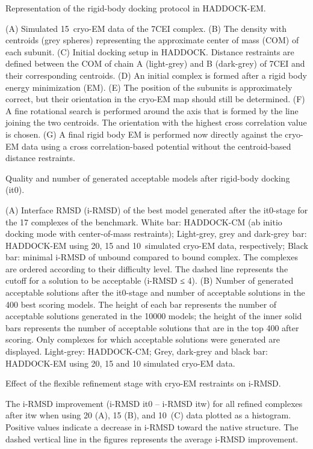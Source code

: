 \caption{Representation of the rigid-body docking protocol in HADDOCK-EM.} 
{(A) Simulated 15\Angstrom\ cryo-EM data of the 7CEI complex. 
(B) The density with centroids (grey spheres) representing the approximate
center of mass (COM) of each subunit. 
(C) Initial docking setup in HADDOCK. Distance restraints are defined between
the COM of chain A (light-grey) and B (dark-grey) of 7CEI and their
corresponding centroids. 
(D) An initial complex is formed after a rigid body energy minimization (EM). 
(E) The position of the subunits is approximately correct, but their
orientation in the cryo-EM map should still be determined. 
(F) A fine rotational search is performed around the axis that is formed by the
line joining the two centroids. 
The orientation with the highest cross correlation value is chosen. 
(G) A final rigid body EM is performed now directly against the cryo-EM data
using a cross correlation-based potential without the centroid-based distance
restraints.}
\stopbuffer


\caption{Quality and number of generated acceptable models after rigid-body
docking (it0).}
{(A) Interface RMSD (i-RMSD) of the best model generated after the it0-stage
for the 17 complexes of the benchmark. White bar: HADDOCK-CM (ab initio docking
mode with center-of-mass restraints); Light-grey, grey and dark-grey bar:
HADDOCK-EM using 20, 15 and 10\Angstrom\ simulated cryo-EM data, respectively; Black
bar: minimal i-RMSD of unbound compared to bound complex. The complexes are
ordered according to their difficulty level. The dashed line represents the
cutoff for a solution to be acceptable (i-RMSD ≤ 4\Angstrom).
(B) Number of generated acceptable solutions after the it0-stage and number of
acceptable solutions in the 400 best scoring models. The height of each bar
represents the number of acceptable solutions generated in the 10000 models;
the height of the inner solid bars represents the number of acceptable
solutions that are in the top 400 after scoring. Only complexes for which
acceptable solutions were generated are displayed. Light-grey: HADDOCK-CM;
Grey, dark-grey and black bar: HADDOCK-EM using 20, 15 and 10\Angstrom
simulated cryo-EM data.}
\stopbuffer
        

\caption{Effect of the flexible refinement stage with cryo-EM restraints on i-RMSD.}
{The i-RMSD improvement (i-RMSD it0 – i-RMSD itw) for all refined complexes
after itw when using 20 (A), 15 (B), and 10\Angstrom\ (C) data plotted as a histogram. 
Positive values indicate a decrease in i-RMSD toward the native structure. The
dashed vertical line in the figures represents the average i-RMSD improvement.}
\stopbuffer


